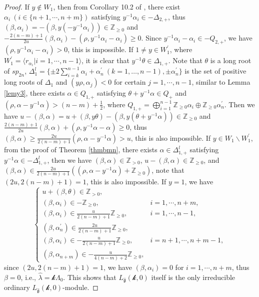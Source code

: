 \documentclass[12pt]{article}
\begin{document}
\begin{proof}
If $y\notin W_1$, then from Corollary 10.2 of \cite{Hum78}, there exist $\alpha_i ~(i\in\{n+1,\cdots,n+m\})$ satisfying $y^{-1}\alpha_i\in -\Delta_{2,+}$,
thus $(\beta,\alpha_i)=-(\beta,y(-y^{-1}\alpha_i))\in\mathbb{Z}_{\geq0}$ and
$-\frac{2(n-m)+1}{2u}(\beta,\alpha_i)-(\rho,y^{-1}\alpha_i-\alpha_i)\geq0$.
Since $y^{-1}\alpha_i-\alpha_i\in-Q_{2,+}$, we have $(\rho,y^{-1}\alpha_i-\alpha_i)>0$,
this is impossible.
If $1\ne y\in W_1^\prime$, where $W_1^\prime=\langle r_{\alpha_i}|i=1,\cdots,n-1\rangle$, it is clear that $y^{-1}\theta\in \Delta_{1,+}$.
Note that $\theta$ is a long root of $sp_{2n}$, $\Delta_{1}^l=\{ \pm2\sum_{i=k}^{n-1} \alpha_i+\alpha_n^\prime ~(k=1, \dots, n-1), \pm\alpha_n^\prime\}$
is the set of positive long roots of $\Delta_1$
and $(y\rho, \alpha_j)<0$ for certain $j=1,\cdots,n-1$,
similar to Lemma \ref{lemy3}, there exists $\alpha\in Q_{1,+}$ satisfying $\theta+y^{-1}\alpha\in Q_+$ and $(\rho,\alpha-y^{-1}\alpha)>(n-m)+\frac{1}{2}$, where $Q_{1,+}=\bigoplus_{i=1}^{n-1}\mathbb{Z}_{\geq0}\alpha_i\oplus\mathbb{Z}_{\geq0}\alpha_n^\prime$.
Then we have $u-(\beta,\alpha)=u+(\beta,y\theta)-(\beta,y(\theta+y^{-1}\alpha))\in\mathbb{Z}_{\geq0}$ and $\frac{2(n-m)+1}{2u}(\beta,\alpha)+(\rho,y^{-1}\alpha-\alpha)\geq0$, thus $(\beta,\alpha)\geq\frac{2u}{2(n-m)+1}(\rho,\alpha-y^{-1}\alpha)>u$,
this is also impossible.
If $y\in W_1\backslash W_1^\prime$, from the proof of Theorem \ref{thmbmn},
there exists \(\alpha \in \Delta_{1,+}^l\) satisfying \(y^{-1}\alpha \in -\Delta_{1,+}^l\),
then we have $(\beta, \alpha)\in \mathbb{Z}_{>0}$,
$u-(\beta,\alpha)\in\mathbb{Z}_{\geq0}$,
and $(\beta,\alpha)\in \frac{2u}{2(n-m)+1}((\rho,\alpha-y^{-1}\alpha)+\mathbb{Z}_{\geq0})$, note that $(2u,2(n-m)+1)=1$, this is also impossible.
If $y=1$, we have
$$\begin{cases}
u+(\beta,\theta)\in\mathbb{Z}_{>0},\\
 (\beta,\alpha_i)\in-\mathbb{Z}_{\geq0},&i=1,\cdots,n+m,\\
(\beta,\alpha_i)\in \frac{u}{2(n-m)+1}\mathbb{Z}_{\geq0},&i=1,\cdots,n-1,\\
(\beta,\alpha_n^\prime)\in  \frac{2u}{2(n-m)+1}\mathbb{Z}_{\geq0},\\
(\beta,\alpha_i)\in -\frac{u}{2(n-m)+1}\mathbb{Z}_{\geq0},&i=n+1,\cdots,n+m-1,\\
(\beta,\alpha_{n+m})\in -\frac{u}{4(n-m)+2}\mathbb{Z}_{\geq0},
\end{cases}$$
since $(2u,2(n-m)+1)=1$, we have $(\beta,\alpha_i)=0$ for $i=1,\cdots,n+m$, thus $\beta=0$, i.e., $\hat{\lambda}=\mathcal{k}\Lambda_0$.
This shows that $L_{\widehat{\mathfrak{g}}}(\mathcal{k},0)$ itself is the only irreducible ordinary $L_{\widehat{\mathfrak{g}}}(\mathcal{k},0)$-module.
\end{proof}
\end{document}

